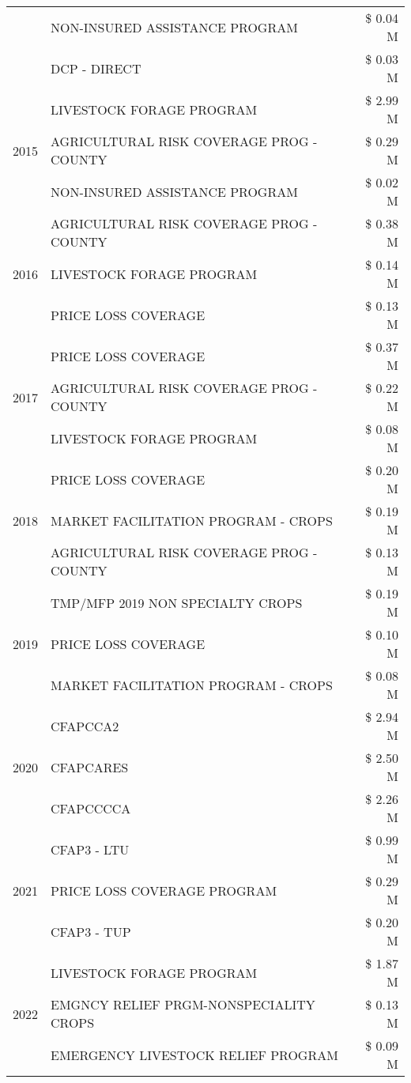 \begin{tabular}{llr}
 & NON-INSURED ASSISTANCE PROGRAM & \$ 0.04 M \\
 & DCP - DIRECT & \$ 0.03 M \\
\cline{1-3}
\multirow[t]{3}{*}{2015} & LIVESTOCK FORAGE PROGRAM & \$ 2.99 M \\
 & AGRICULTURAL RISK COVERAGE PROG - COUNTY & \$ 0.29 M \\
 & NON-INSURED ASSISTANCE PROGRAM & \$ 0.02 M \\
\cline{1-3}
\multirow[t]{3}{*}{2016} & AGRICULTURAL RISK COVERAGE PROG - COUNTY & \$ 0.38 M \\
 & LIVESTOCK FORAGE PROGRAM & \$ 0.14 M \\
 & PRICE LOSS COVERAGE & \$ 0.13 M \\
\cline{1-3}
\multirow[t]{3}{*}{2017} & PRICE LOSS COVERAGE & \$ 0.37 M \\
 & AGRICULTURAL RISK COVERAGE PROG - COUNTY & \$ 0.22 M \\
 & LIVESTOCK FORAGE PROGRAM & \$ 0.08 M \\
\cline{1-3}
\multirow[t]{3}{*}{2018} & PRICE LOSS COVERAGE & \$ 0.20 M \\
 & MARKET FACILITATION PROGRAM - CROPS & \$ 0.19 M \\
 & AGRICULTURAL RISK COVERAGE PROG - COUNTY & \$ 0.13 M \\
\cline{1-3}
\multirow[t]{3}{*}{2019} & TMP/MFP 2019 NON SPECIALTY CROPS & \$ 0.19 M \\
 & PRICE LOSS COVERAGE & \$ 0.10 M \\
 & MARKET FACILITATION PROGRAM - CROPS & \$ 0.08 M \\
\cline{1-3}
\multirow[t]{3}{*}{2020} & CFAPCCA2 & \$ 2.94 M \\
 & CFAPCARES & \$ 2.50 M \\
 & CFAPCCCCA & \$ 2.26 M \\
\cline{1-3}
\multirow[t]{3}{*}{2021} & CFAP3 - LTU & \$ 0.99 M \\
 & PRICE LOSS COVERAGE PROGRAM & \$ 0.29 M \\
 & CFAP3 - TUP & \$ 0.20 M \\
\cline{1-3}
\multirow[t]{3}{*}{2022} & LIVESTOCK FORAGE PROGRAM & \$ 1.87 M \\
 & EMGNCY RELIEF PRGM-NONSPECIALITY CROPS & \$ 0.13 M \\
 & EMERGENCY LIVESTOCK RELIEF PROGRAM & \$ 0.09 M \\
\cline{1-3}
\bottomrule
\end{tabular}
